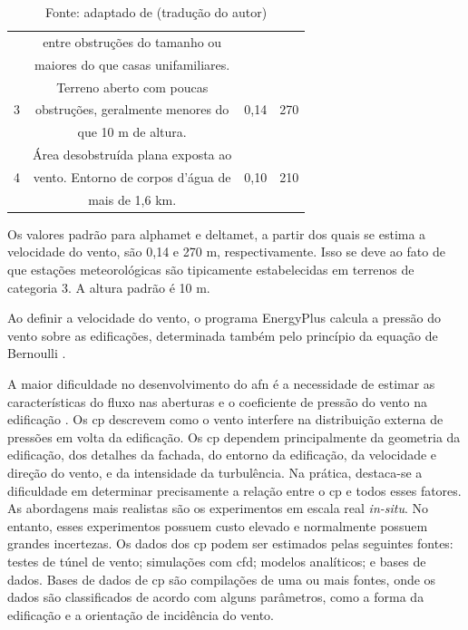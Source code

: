 \documentclass[brazil,hardcopy,openany]{ufscthesis} %
\newcommand{\source}[1]{\small \caption*{Fonte: {#1}} } %
\begin{document}
\begin{table}[h]
{\begin{tabular}{|c |c |c |c | }
			{} & entre obstruções do tamanho ou & {} & \\
			{} & maiores do que casas unifamiliares. & {} & \\
			\hline
			{} & Terreno aberto com poucas & {} & \\
			3 & obstruções, geralmente menores do & 0,14 & 270  \\
			{} & que 10 m de altura. & {} & \\
			\hline
			{} & Área desobstruída plana exposta ao & {} & \\
			4 & vento. Entorno de corpos d’água de & 0,10 & 210  \\
			{} & mais de 1,6 km. & {} & \\
			\hline
			
		\end{tabular}
	}
	\source{adaptado de  (tradução do autor)}
\end{table}

Os valores padrão para \gls{alphamet} e \gls{deltamet}, a partir dos quais se estima a velocidade do vento, são 0,14 e 270 m, respectivamente. Isso se deve ao fato de que estações meteorológicas são tipicamente estabelecidas em terrenos de categoria 3. A altura padrão é 10 m. 

Ao definir a velocidade do vento, o programa EnergyPlus calcula a pressão do vento sobre as edificações, determinada também pelo princípio da equação de Bernoulli \cite{Walton1989}.

A maior dificuldade no desenvolvimento do \acrshort{afn} é a necessidade de estimar as características do fluxo nas aberturas e o coeficiente de pressão do vento na edificação \cite{Arendt2017}. Os \acrfull{cp} descrevem como o vento interfere na distribuição externa de pressões em volta da edificação. 
Os \acrshort{cp} dependem principalmente da geometria da edificação, dos detalhes da fachada, do entorno da edificação, da velocidade e direção do vento, e da intensidade da turbulência. Na prática, destaca-se a dificuldade em determinar precisamente a relação entre o \acrshort{cp} e todos esses fatores. As abordagens mais realistas são os experimentos em escala real \textit{in-situ}. No entanto, esses experimentos possuem custo elevado e normalmente possuem grandes incertezas. 
Os dados dos \acrshort{cp} podem ser estimados pelas seguintes fontes: testes de túnel de vento; simulações com \acrshort{cfd}; modelos analíticos; e bases de dados.
Bases de dados de \acrshort{cp} são compilações de uma ou mais fontes, onde os dados são classificados de acordo com alguns parâmetros, como a forma da edificação e a orientação de incidência do vento. 
\end{document}
